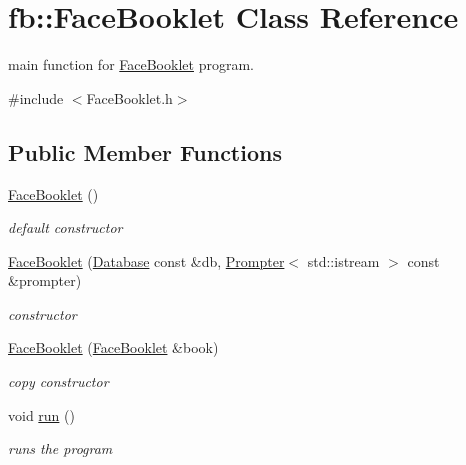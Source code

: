 \hypertarget{classfb_1_1_face_booklet}{\section{fb\+:\+:Face\+Booklet Class Reference}
\label{classfb_1_1_face_booklet}
}


main function for \hyperlink{classfb_1_1_face_booklet}{Face\+Booklet} program.  




{\ttfamily \#include $<$Face\+Booklet.\+h$>$}

\subsection*{Public Member Functions}
\begin{DoxyCompactItemize}
\item 
\hypertarget{classfb_1_1_face_booklet_ab8c98ceebb70c063a3f2f26247fddfdf}{\hyperlink{classfb_1_1_face_booklet_ab8c98ceebb70c063a3f2f26247fddfdf}{Face\+Booklet} ()}\label{classfb_1_1_face_booklet_ab8c98ceebb70c063a3f2f26247fddfdf}

\begin{DoxyCompactList}\small\item\em default constructor \end{DoxyCompactList}\item 
\hyperlink{classfb_1_1_face_booklet_a1346801b212aea2b90d5d7c9e0e75013}{Face\+Booklet} (\hyperlink{classfb_1_1_database}{Database} const \&db, \hyperlink{classfb_1_1_prompter}{Prompter}$<$ std\+::istream $>$ const \&prompter)
\begin{DoxyCompactList}\small\item\em constructor \end{DoxyCompactList}\item 
\hypertarget{classfb_1_1_face_booklet_aa1fa5bb03950611fda39e83b239a2788}{\hyperlink{classfb_1_1_face_booklet_aa1fa5bb03950611fda39e83b239a2788}{Face\+Booklet} (\hyperlink{classfb_1_1_face_booklet}{Face\+Booklet} \&book)}\label{classfb_1_1_face_booklet_aa1fa5bb03950611fda39e83b239a2788}

\begin{DoxyCompactList}\small\item\em copy constructor \end{DoxyCompactList}\item 
void \hyperlink{classfb_1_1_face_booklet_a59e4c9ecf6767a14f9b79d4f6cfa2c6d}{run} ()
\begin{DoxyCompactList}\small\item\em runs the program \end{DoxyCompactList}\end{DoxyCompactItemize}
